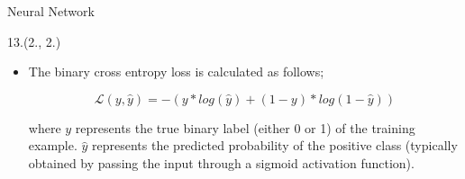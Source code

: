 \documentclass[12pt, xcolor={dvipsnames}, aspectratio = 169, sans,mathserif]{beamer}
\newenvironment{List}[2]
{\begin{textblock}{#1}#2
\begin{itemize}}
{\end{itemize}
\end{textblock}}
\begin{document}
\begin{frame}{Neural Network}

\begin{List}{13.}{(2., 2.)}

  \item The binary cross entropy loss is calculated as follows;

  \begin{equation*}
  \mathcal{L}(y, \hat{y}) = - (y* log(\hat{y}) + (1-y)* log(1 - \hat{y}))
  \end{equation*}

  where $y$ represents the true binary label (either 0 or 1) of the training example. $\hat{y}$ represents the predicted probability
  of the positive class (typically obtained by passing the input through a sigmoid activation function).

\end{List}

\end{frame}
\end{document}

